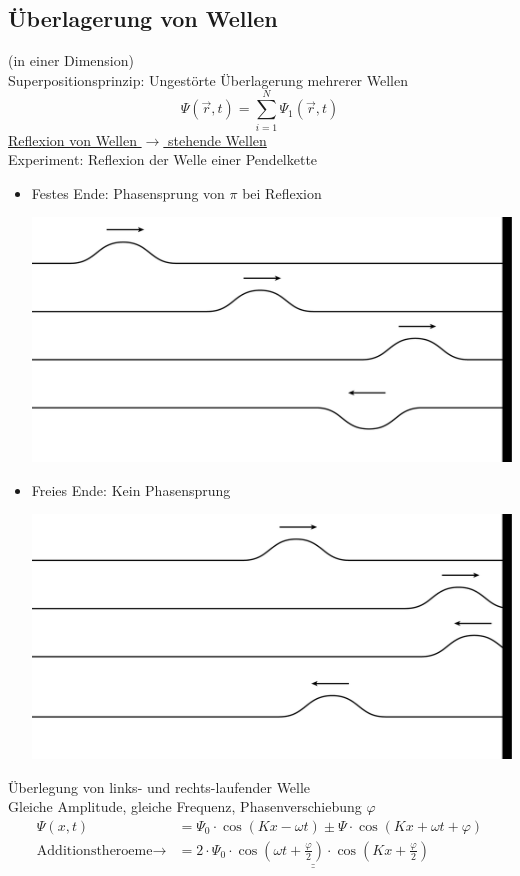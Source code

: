 \subsection{Überlagerung von Wellen} (in einer Dimension)\\
Superpositionsprinzip: Ungestörte Überlagerung mehrerer Wellen
$$ \Psi(\vec{r},t) = \sum_{i=1}^{N} \Psi_1(\vec{r},t)$$
\underline{Reflexion von Wellen $ \rightarrow $ stehende Wellen}\\
Experiment: Reflexion der Welle einer Pendelkette
\begin{itemize}
	\item Festes Ende: Phasensprung von $ \pi $ bei Reflexion
	\begin{center}
		\includegraphics[width=0.7\linewidth]{skizzen/19/19B12}
	\end{center}
	\item Freies Ende: Kein Phasensprung
	\begin{center}
		\includegraphics[width=0.7\linewidth]{skizzen/19/19B13}
	\end{center}
\end{itemize}
Überlegung von links- und rechts-laufender Welle\\
Gleiche Amplitude, gleiche Frequenz, Phasenverschiebung $ \varphi $
\begin{align*}
\Psi(x,t) &=\Psi_0 \cdot \cos(Kx-\omega t) \pm \Psi \cdot \cos(Kx+\omega t + \varphi)\\
\text{Additionstheroeme} \rightarrow &= \underline{\underline{2\cdot\Psi_0\cdot\cos(\omega t + \frac{\varphi}{2}) \cdot \cos(Kx+\frac{\varphi}{2})  } }
\end{align*}
